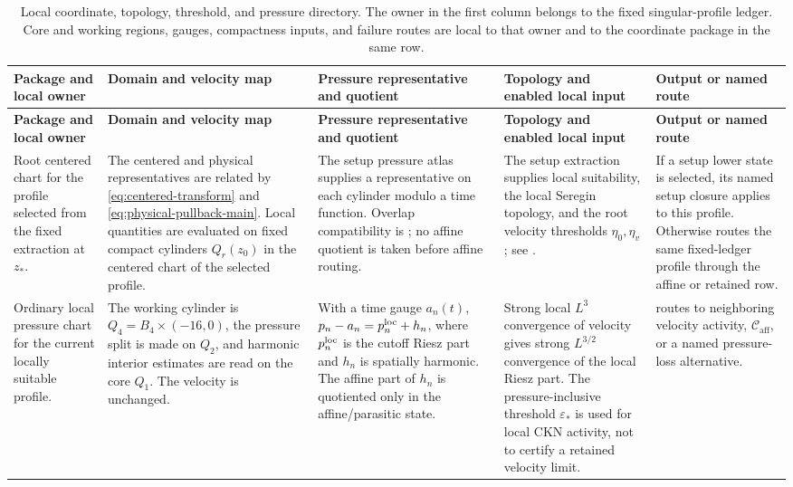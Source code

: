 \documentclass[11pt]{amsart}
\numberwithin{equation}{section}
\theoremstyle{plain}
\theoremstyle{definition}
\theoremstyle{remark}
\newcommand{\eps}{\varepsilon}
\newcommand{\Caff}{\mathcal C_{\mathrm{aff}}}
\begin{document}
\begingroup
\scriptsize
\setlength{\tabcolsep}{2pt}
\renewcommand{\arraystretch}{1.18}
\begin{longtable}{@{}L{0.15\textwidth}L{0.19\textwidth}L{0.20\textwidth}L{0.20\textwidth}L{0.18\textwidth}@{}}
\caption{Local coordinate, topology, threshold, and pressure directory.  The
owner in the first column belongs to the fixed singular-profile ledger.  Core
and working regions, gauges, compactness inputs, and failure routes are local to
that owner and to the coordinate package in the same row.}
\label{tab:local-coordinate-pressure-directory}\\
\hline
\textbf{Package and local owner} & \textbf{Domain and velocity map} &
\textbf{Pressure representative and quotient} &
\textbf{Topology and enabled local input} & \textbf{Output or named route}\\
\hline
\endfirsthead
\hline
\textbf{Package and local owner} & \textbf{Domain and velocity map} &
\textbf{Pressure representative and quotient} &
\textbf{Topology and enabled local input} & \textbf{Output or named route}\\
\hline
\endhead
\hline
\endfoot
Root centered chart for the profile selected from the fixed extraction at
\(z_*\). &
The centered and physical representatives are related by
\eqref{eq:centered-transform} and \eqref{eq:physical-pullback-main}.  Local
quantities are evaluated on fixed compact cylinders \(Q_r(z_0)\) in the
centered chart of the selected profile. &
The setup pressure atlas supplies a representative on each cylinder modulo a
time function.  Overlap compatibility is
; no affine quotient is taken
before affine routing. &
The setup extraction supplies local suitability, the local Seregin topology,
and the root velocity thresholds \(\eta_0,\eta_v\); see
. &
If a setup lower state is selected, its named setup closure applies to this
profile.  Otherwise  routes the same
fixed-ledger profile through the affine or retained row.\\

Ordinary local pressure chart for the current locally suitable profile. &
The working cylinder is \(Q_4=B_4\times(-16,0)\), the pressure split is made on
\(Q_2\), and harmonic interior estimates are read on the core \(Q_1\).  The
velocity is unchanged. &
With a time gauge \(a_n(t)\),
\(p_n-a_n=p_n^{\rm loc}+h_n\), where \(p_n^{\rm loc}\) is the cutoff Riesz
part and \(h_n\) is spatially harmonic.  The affine part of \(h_n\) is
quotiented only in the affine/parasitic state. &
Strong local \(L^3\) convergence of velocity gives strong
\(L^{3/2}\) convergence of the local Riesz part.  The pressure-inclusive
threshold \(\eps_*\) is used for local CKN activity, not to certify a retained
velocity limit. &
routes to neighboring velocity activity, \(\Caff\), or a named
pressure-loss alternative.\\


\end{longtable}
\end{document}
